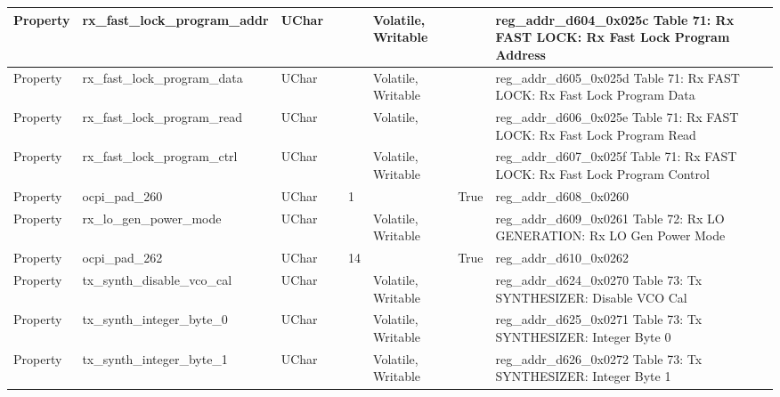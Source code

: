 \documentclass{article}
\begin{document}
\begin{scriptsize}
\begin{longtable}{|p{2cm}|p{5cm}|p{1cm}|p{2cm}|p{2cm}|p{1.75cm}|p{1.5cm}|p{5.1cm}|}
  \hline
  Property & rx\_fast\_lock\_program\_addr                            & UChar &                  &                  & Volatile,  Writable &         & reg\_addr\_d604\_0x025c Table 71: Rx FAST LOCK: Rx Fast Lock Program Address \\
  \hline
  Property & rx\_fast\_lock\_program\_data                            & UChar &                  &                  & Volatile,  Writable &         & reg\_addr\_d605\_0x025d Table 71: Rx FAST LOCK: Rx Fast Lock Program Data \\
  \hline
  Property & rx\_fast\_lock\_program\_read                            & UChar &                  &                  & Volatile,           &         & reg\_addr\_d606\_0x025e Table 71: Rx FAST LOCK: Rx Fast Lock Program Read \\
  \hline
  Property & rx\_fast\_lock\_program\_ctrl                            & UChar &                  &                  & Volatile,  Writable &         & reg\_addr\_d607\_0x025f Table 71: Rx FAST LOCK: Rx Fast Lock Program Control \\
  \hline
  Property & ocpi\_pad\_260                                           & UChar &                  & 1                &                     & True    & reg\_addr\_d608\_0x0260 \\
  \hline
  Property & rx\_lo\_gen\_power\_mode                                 & UChar &                  &                  & Volatile,  Writable &         & reg\_addr\_d609\_0x0261 Table 72: Rx LO GENERATION: Rx LO Gen Power Mode \\
  \hline
  Property & ocpi\_pad\_262                                           & UChar &                  & 14               &                     & True    & reg\_addr\_d610\_0x0262 \\
  \hline
  Property & tx\_synth\_disable\_vco\_cal                             & UChar &                  &                  & Volatile,  Writable &         & reg\_addr\_d624\_0x0270 Table 73: Tx SYNTHESIZER: Disable VCO Cal \\
  \hline
  Property & tx\_synth\_integer\_byte\_0                              & UChar &                  &                  & Volatile,  Writable &         & reg\_addr\_d625\_0x0271 Table 73: Tx SYNTHESIZER: Integer Byte 0 \\
  \hline
  Property & tx\_synth\_integer\_byte\_1                              & UChar &                  &                  & Volatile,  Writable &         & reg\_addr\_d626\_0x0272 Table 73: Tx SYNTHESIZER: Integer Byte 1 \\

\end{longtable}
\end{scriptsize}
\end{document}
